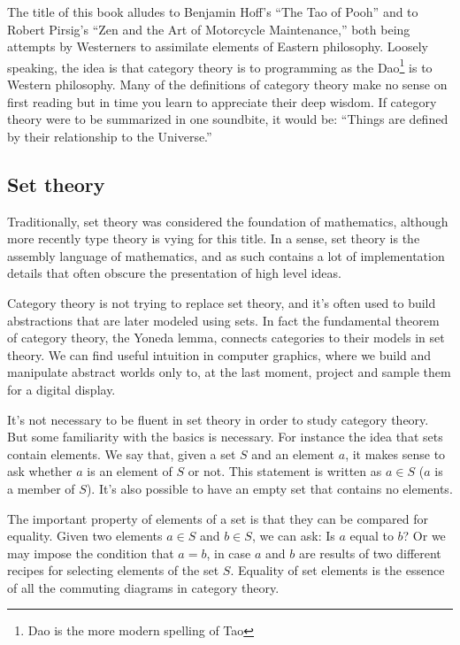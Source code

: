 \documentclass[11pt, book]{memoir}
\begin{document}
The title of this book alludes to Benjamin Hoff's ``The Tao of Pooh'' and to Robert Pirsig's ``Zen and the Art of Motorcycle Maintenance,'' both being attempts by Westerners to assimilate elements of Eastern philosophy. Loosely speaking, the idea is that category theory is to programming as the Dao\footnote{Dao is the more modern spelling of Tao} is to Western philosophy. Many of the definitions of category theory make no sense on first reading but in time you learn to appreciate their deep wisdom. If category theory were to be summarized in one soundbite, it would be: ``Things are defined by their relationship to the Universe.'' 

\subsection{Set theory}

Traditionally, set theory was considered the foundation of mathematics, although more recently type theory is vying for this title. In a sense, set theory is the assembly language of mathematics, and as such contains a lot of implementation details that often obscure  the presentation of high level ideas. 

Category theory is not trying to replace set theory, and it's often used to build abstractions that are later modeled using sets. In fact the fundamental theorem of category theory, the Yoneda lemma, connects categories to their models in set theory. We can find useful intuition in computer graphics, where we build and manipulate abstract worlds only to, at the last moment, project and sample them for a digital display.

It's not necessary to be fluent in set theory in order to study category theory. But some familiarity with the basics is necessary. For instance the idea that sets contain elements. We say that, given a set $S$ and an element $a$, it makes sense to ask whether $a$ is an element of $S$ or not. This statement is written as $a \in S$ ($a$ is a member of $S$). It's also possible to have an empty set that contains no elements. 

The important property of elements of a set is that they can be compared for equality. Given two elements $a \in S$ and $b \in S$, we can ask: Is $a$ equal to $b$? Or we may impose the condition that $a = b$, in case $a$ and $b$ are results of two different recipes for selecting elements of the set $S$. Equality of set elements is the essence of all the commuting diagrams in category theory.
\end{document}
